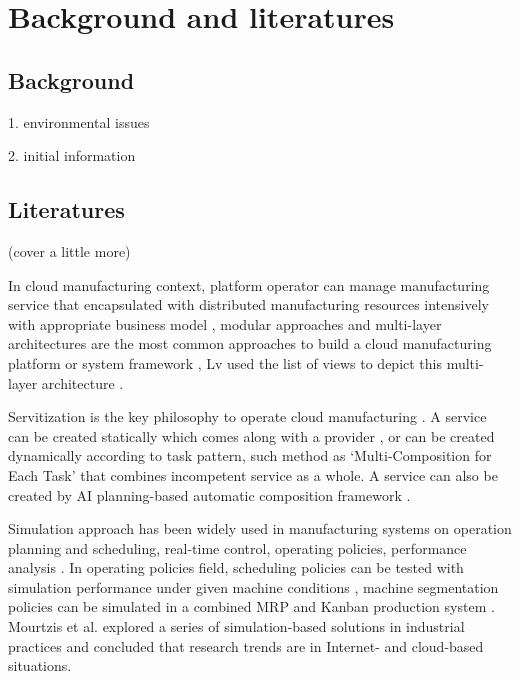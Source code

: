 \section{Background and literatures} %
\label{sec:literature_review}
\subsection{Background} %
\label{sub:background}
1. environmental issues

2. initial information

\subsection{Literatures} %
\label{sub:literatures}
(cover a little more)

In cloud manufacturing context, platform operator can manage  manufacturing service that encapsulated with distributed manufacturing resources intensively with appropriate business model \cite{Xu2012}, modular approaches and multi-layer architectures are the most common approaches to build a cloud manufacturing platform or system framework \cite{Tao2012,Valilai2013}, Lv used the list of views to depict this multi-layer architecture \cite{LvJuly312012-Aug.22012}.

Servitization is the key philosophy to operate cloud manufacturing \cite{li2010cloud}. A  service can be created statically which comes along with a provider \cite{Tao2012}, or can be created dynamically according to task pattern, such method as `Multi-Composition for Each Task' \cite{Liu2013} that combines incompetent service as a whole. A service can also be created by AI planning-based automatic composition framework \cite{OhJan.-March2008}.

Simulation approach has been widely used in manufacturing systems on operation planning and scheduling, real-time control, operating policies, performance analysis \cite{Smith2003}. In operating policies field, scheduling policies can be tested with simulation performance under given machine conditions \cite{Sabuncuoglu2003}, machine
segmentation policies can be simulated in a combined MRP and Kanban production system \cite{Felberbauer9-12Dec.2012}. Mourtzis et al. \cite{Mourtzis2015} explored a series of simulation-based solutions in industrial practices and concluded that research trends are in  Internet- and cloud-based situations.

